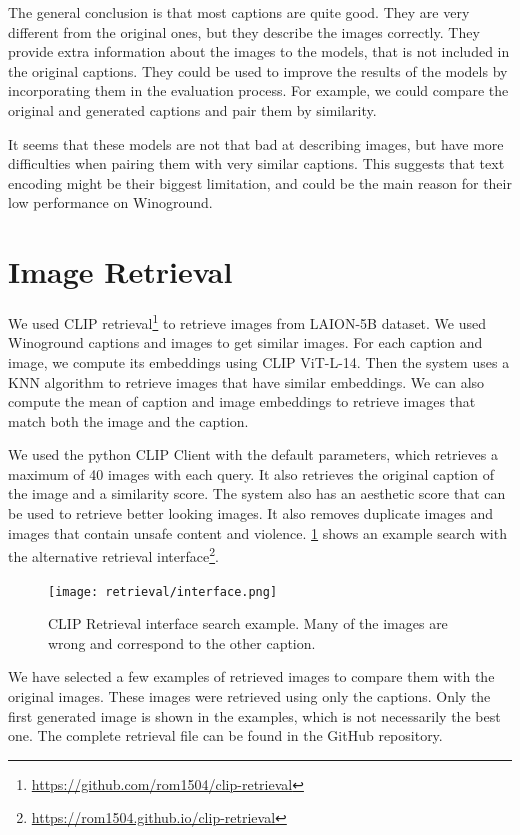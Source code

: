 The general conclusion is that most captions are quite good. They are very different from the original ones, but they describe the images correctly. They provide extra information about the images to the models, that is not included in the original captions. They could be used to improve the results of the models by incorporating them in the evaluation process. For example, we could compare the original and generated captions and pair them by similarity.

It seems that these models are not that bad at describing images, but have more difficulties when pairing them with very similar captions. This suggests that text encoding might be their biggest limitation, and could be the main reason for their low performance on Winoground.

\section{Image Retrieval} \label{image_retrieval}

We used CLIP retrieval\footnote{\url{https://github.com/rom1504/clip-retrieval}} to retrieve images from LAION-5B \cite{schuhmann2022laionb} dataset. We used Winoground captions and images to get similar images. For each caption and image, we compute its embeddings using CLIP ViT-L-14. Then the system uses a KNN algorithm to retrieve images that have similar embeddings. We can also compute the mean of caption and image embeddings to retrieve images that match both the image and the caption. 

We used the python CLIP Client with the default parameters, which retrieves a maximum of 40 images with each query. It also retrieves the original caption of the image and a similarity score. The system also has an aesthetic score that can be used to retrieve better looking images. It also removes duplicate images and images that contain unsafe content and violence. \cref{fig:retrieval_interface} shows an example search with the alternative retrieval interface\footnote{\url{https://rom1504.github.io/clip-retrieval}}.

\begin{figure}[ht]
    \centering
    \texttt{[image: retrieval/interface.png]}
    \caption{CLIP Retrieval interface search example. Many of the images are wrong and correspond to the other caption.}
    \label{fig:retrieval_interface}
\end{figure}

We have selected a few examples of retrieved images to compare them with the original images. These images were retrieved using only the captions. Only the first generated image is shown in the examples, which is not necessarily the best one. The complete retrieval file can be found in the GitHub repository.

